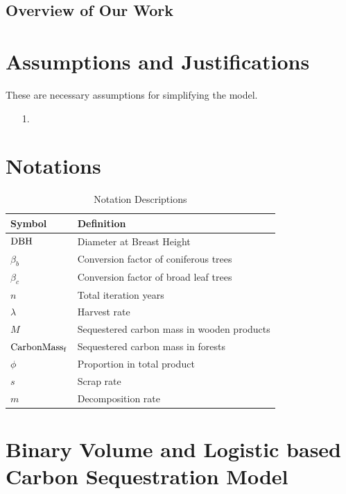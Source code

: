 \documentclass{mcmthesis}
\numberwithin{figure}{section}
\numberwithin{table}{section}
\numberwithin{equation}{section}
\begin{document}
\newpage
\subsection{Overview of Our Work}




\section{Assumptions and Justifications}
These are necessary assumptions for simplifying the model.
\begin{enumerate}
  \item [1.] 
\end{enumerate}


\section{Notations}

\renewcommand\arraystretch{1.5}

\begin{table}[htpb!]
  \centering
  \caption{Notation Descriptions}
  \begin{tabular}{m{2.5cm}<{\centering}|m{12.5cm}<{\centering}}
  \toprule[1.5pt]
  \textbf{Symbol} & \textbf{Definition} \\ \hline
  $ \rm{DBH} $ & Diameter at Breast Height \\
  $ \beta_b $ & Conversion factor of coniferous trees\\
  $\beta_c$ & Conversion factor of broad leaf trees\\
  $ n $ & Total iteration years\\
  $ \lambda $ & Harvest rate\\
  $ M $ & Sequestered carbon mass in wooden products \\
  $ \rm{CarbonMass_f} $ & Sequestered carbon mass in forests \\
  $ \phi $ & Proportion in total product\\
  $ s $ & Scrap rate\\
  $ m $ & Decomposition rate \\

  \bottomrule[1.5pt]
  \end{tabular}
\end{table}


\section{Binary Volume and Logistic based Carbon Sequestration Model}
\end{document}
